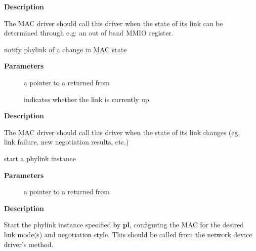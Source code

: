\documentclass[a4paper,8pt,english]{sphinxmanual}
\begin{document}
\textbf{Description}

The MAC driver should call this driver when the state of its link
can be determined through e.g: an out of band MMIO register.

\begin{fulllineitems}
\label{networking/kapi:c.phylink_mac_change}
notify phylink of a change in MAC state

\end{fulllineitems}


\textbf{Parameters}
\begin{description}
\item[{}] \leavevmode
a pointer to a {\hyperref[networking/kapi:c.phylink]{\emph{}}} returned from {\hyperref[networking/kapi:c.phylink_create]{\emph{}}}

\item[{}] \leavevmode
indicates whether the link is currently up.

\end{description}

\textbf{Description}

The MAC driver should call this driver when the state of its link
changes (eg, link failure, new negotiation results, etc.)

\begin{fulllineitems}
\label{networking/kapi:c.phylink_start}
start a phylink instance

\end{fulllineitems}


\textbf{Parameters}
\begin{description}
\item[{}] \leavevmode
a pointer to a {\hyperref[networking/kapi:c.phylink]{\emph{}}} returned from {\hyperref[networking/kapi:c.phylink_create]{\emph{}}}

\end{description}

\textbf{Description}

Start the phylink instance specified by \textbf{pl}, configuring the MAC for the
desired link mode(s) and negotiation style. This should be called from the
network device driver's   method.
\end{document}
